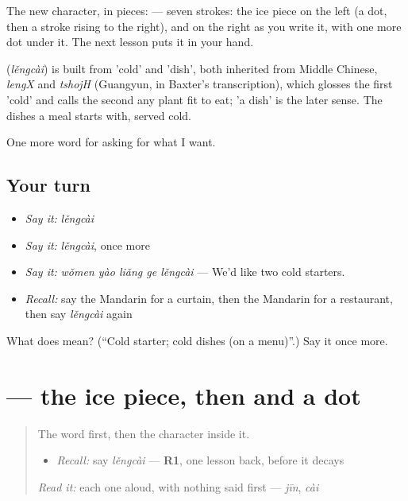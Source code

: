 The new character, in pieces:  — seven strokes: the ice piece on the left (a dot, then a stroke rising to the right), and on the right  as you write it, with one more dot under it. The next lesson puts it in your hand.

\begin{cousinweb}
\textbf{} (\emph{lěngcài}) is built from  'cold' and  'dish', both inherited from Middle Chinese, \emph{lengX} and \emph{tshojH} (Guangyun, in Baxter's transcription), which glosses the first 'cold' and calls the second any plant fit to eat; 'a dish' is the later sense. The dishes a meal starts with, served cold.
\end{cousinweb}

\begin{grammarlens}[title={What you've built}]
One more word for asking for what I want.
\end{grammarlens}

\subsection*{Your turn}
\begin{itemize}
\raggedright
  \item \emph{Say it:} \emph{lěngcài}
  \item \emph{Say it:} \emph{lěngcài}, once more
  \item \emph{Say it:} \emph{wǒmen yào liǎng ge lěngcài} — We'd like two cold starters.
  \item \emph{Recall:} say the Mandarin for a curtain, then the Mandarin for a restaurant, then say \emph{lěngcài} again
\end{itemize}

\begin{tcolorbox}[breakable,colback=teal!4,colframe=teal!35!black,title={Before you move on}]
What does  mean? (\textquotedblleft{}Cold starter; cold dishes (on a menu)\textquotedblright{}.) Say it once more.
\end{tcolorbox}
\section[\texorpdfstring{\zh{冷} (lěng)}{冷 (lěng)}]{ — the ice piece, then  and a dot}

\label{lesson:ZH-W182-leng-cold}



\begin{quote}
The word first, then the character inside it.

\begin{itemize}
\raggedright
  \item \emph{Recall:} say \emph{lěngcài} — \textbf{R1}, one lesson back, before it decays
\end{itemize}

\begin{quote}
 
\end{quote}

\emph{Read it:} each one aloud, with nothing said first — \emph{jīn}, \emph{cài}
\end{quote}

